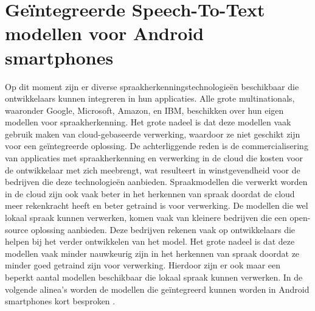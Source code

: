 

\section{Geïntegreerde Speech-To-Text modellen voor Android smartphones}
Op dit moment zijn er diverse spraakherkenningstechnologieën beschikbaar die ontwikkelaars kunnen integreren in hun applicaties. Alle grote multinationals, waaronder Google, Microsoft, Amazon, en IBM, beschikken over hun eigen modellen voor spraakherkenning. Het grote nadeel is dat deze modellen vaak gebruik maken van cloud-gebaseerde verwerking, waardoor ze niet geschikt zijn voor een geïntegreerde oplossing. De achterliggende reden is de commercialisering van applicaties met spraakherkenning en verwerking in de cloud die kosten voor de ontwikkelaar met zich meebrengt, wat resulteert in winstgevendheid voor de bedrijven die deze technologieën aanbieden. Spraakmodellen die verwerkt worden in de cloud zijn ook vaak beter in het herkennen van spraak doordat de cloud meer rekenkracht heeft en beter getraind is voor verwerking. De modellen die wel lokaal spraak kunnen verwerken, komen vaak van kleinere bedrijven die een open-source oplossing aanbieden. Deze bedrijven rekenen vaak op ontwikkelaars die helpen bij het verder ontwikkelen van het model. Het grote nadeel is dat deze modellen vaak minder nauwkeurig zijn in het herkennen van spraak doordat ze minder goed getraind zijn voor verwerking. Hierdoor zijn er ook maar een beperkt aantal modellen beschikbaar die lokaal spraak kunnen verwerken. In de volgende alinea's worden de modellen die geïntegreerd kunnen worden in Android smartphones kort besproken \autocite{Richards2024}.


